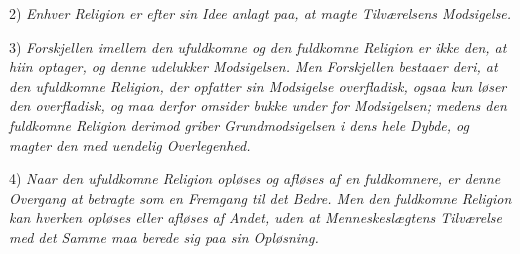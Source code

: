 \documentclass[12pt,a4paper]{book}
\begin{document}
2) \emph{Enhver Religion er efter sin Idee anlagt paa, at magte Tilværelsens
Modsigelse.}

3) \emph{Forskjellen imellem den ufuldkomne og den fuldkomne Religion er ikke
den, at hiin optager, og denne udelukker Modsigelsen. Men Forskjellen bestaaer
deri, at den ufuldkomne Religion, der opfatter sin Modsigelse overfladisk, ogsaa
kun løser den overfladisk, og maa derfor omsider bukke under for Modsigelsen;
medens den fuldkomne Religion derimod griber Grundmodsigelsen i dens hele Dybde,
og magter den med uendelig Overlegenhed.}

4) \emph{Naar den ufuldkomne Religion opløses og afløses af en fuldkomnere, er
denne Overgang at betragte som en Fremgang til det Bedre. Men den fuldkomne
Religion kan hverken opløses eller afløses af Andet, uden at Menneskeslægtens
Tilværelse med det Samme maa berede sig paa sin Opløsning.}
\end{document}
